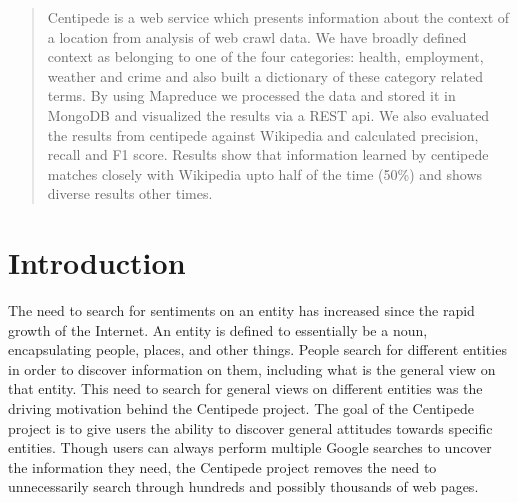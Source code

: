 \documentclass[conference]{IEEEtran}
\begin{document}
\begin{abstract}

Centipede is a web service which presents information about the context of a location from analysis of web crawl data. We have broadly defined context as belonging to one of the four categories: health, employment, weather and crime and also built a dictionary of these category related terms. By using Mapreduce we processed the data and stored it in MongoDB and visualized the results via a REST api. We also evaluated the results from centipede against Wikipedia and calculated precision, recall and F1 score. Results show that information learned by centipede matches closely with Wikipedia upto half of the time (50\%) and shows diverse results other times.     

\end{abstract}





%
\IEEEpeerreviewmaketitle



\section{Introduction}
The need to search for sentiments on an entity has increased since the rapid growth of the Internet. An entity is defined to essentially be a noun, encapsulating people, places, and other things. People search for different entities in order to discover information on them, including what is the general view on that entity. This need to search for general views on different entities was the driving motivation behind the Centipede project. The goal of the Centipede project is to give users the ability to discover general attitudes towards specific entities. Though users can always perform multiple Google searches to uncover the information they need, the Centipede project removes the need to unnecessarily search through hundreds and possibly thousands of web pages. \\
\end{document}
